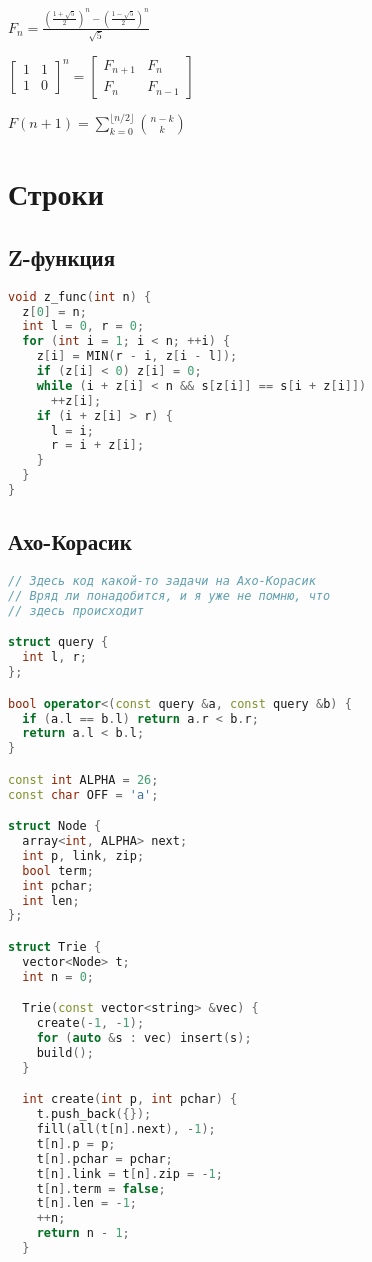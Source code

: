 \documentclass[10pt,a4paper,landscape,twosided]{extarticle}
\begin{document}
\begin{multicols}{3}
$F_n = \frac{\left(\frac{1+\sqrt5}2\right)^n-\left(\frac{1-\sqrt5}2\right)^n}{\sqrt5}$

$\begin{bmatrix}1 & 1 \\ 1 & 0\end{bmatrix}^n=\begin{bmatrix}
    F_{n+1} & F_{n} \\
    F_n & F_{n-1}
\end{bmatrix}$

$F(n+1)=\sum\limits_{k=0}^{\lfloor n/2\rfloor}\binom{n-k}{k}$

\section{Строки}

\subsection{Z-функция}
\begin{lstlisting}[language=C++]
void z_func(int n) {
  z[0] = n;
  int l = 0, r = 0;
  for (int i = 1; i < n; ++i) {
    z[i] = MIN(r - i, z[i - l]);
    if (z[i] < 0) z[i] = 0;
    while (i + z[i] < n && s[z[i]] == s[i + z[i]])
      ++z[i];
    if (i + z[i] > r) {
      l = i;
      r = i + z[i];
    }
  }
}
\end{lstlisting}

\subsection{Ахо-Корасик}
\begin{lstlisting}[language=C++]
// Здесь код какой-то задачи на Ахо-Корасик
// Вряд ли понадобится, и я уже не помню, что
// здесь происходит

struct query {
  int l, r;
};

bool operator<(const query &a, const query &b) {
  if (a.l == b.l) return a.r < b.r;
  return a.l < b.l;
}

const int ALPHA = 26;
const char OFF = 'a';

struct Node {
  array<int, ALPHA> next;
  int p, link, zip;
  bool term;
  int pchar;
  int len;
};

struct Trie {
  vector<Node> t;
  int n = 0;

  Trie(const vector<string> &vec) {
    create(-1, -1);
    for (auto &s : vec) insert(s);
    build();
  }

  int create(int p, int pchar) {
    t.push_back({});
    fill(all(t[n].next), -1);
    t[n].p = p;
    t[n].pchar = pchar;
    t[n].link = t[n].zip = -1;
    t[n].term = false;
    t[n].len = -1;
    ++n;
    return n - 1;
  }


\end{lstlisting}
\end{multicols}
\end{document}
